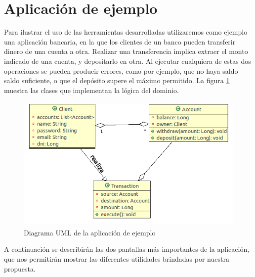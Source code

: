 \section{Aplicación de ejemplo}
Para ilustrar el uso de las herramientas desarrolladas utilizaremos como ejemplo
una aplicación bancaria, en la que los clientes de un banco pueden transferir
dinero de una cuenta a otra. 
Realizar una transferencia implica extraer el
monto indicado de una cuenta, y depositarlo en otra. 
Al ejecutar cualquiera de estas dos operaciones se pueden producir errores,
como por ejemplo, que no haya saldo saldo suficiente, o que el depósito supere
el máximo permitido.
La figura \ref{example} muestra las clases que implementan la lógica del
dominio.

	\begin{figure}[h!]
		\centering
		\includegraphics[width=450px, height=250px]{img/transaccion}
		\caption{Diagrama UML de la aplicación de ejemplo}
		\label{example}
	\end{figure}	

A continuación se describirán las dos pantallas más importantes de la
aplicación, que nos permitirán mostrar las diferentes utilidades brindadas por
nuestra propuesta.
 
